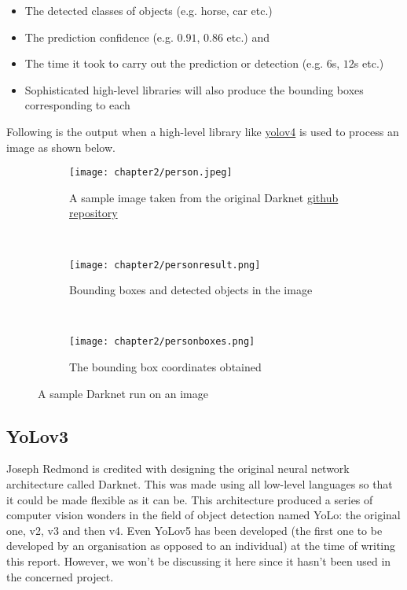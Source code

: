 \begin{itemize}
  \item The detected classes of objects (e.g. horse, car etc.)
  \item	The prediction confidence (e.g. $0.91$, $0.86$ etc.) and
  \item	The time it took to carry out the prediction or detection (e.g. $6$s, $12$s etc.)
  \item	Sophisticated high-level libraries will also produce the bounding boxes corresponding to each
\end{itemize}

\vspace{-0.1in}

Following is the output when a high-level library like \href{https://pypi.org/project/yolov4/}{yolov4} is used to process an image as shown below.

\begin{figure}[h]

\begin{center}
\begin{subfigure}{0.7\textwidth}
  \texttt{[image: chapter2/person.jpeg]}
  \caption{A sample image taken from the original Darknet \href{https://github.com/AlexeyAB/darknet}{github repository}}
  \label{fig:person_sub1}
 \end{subfigure} \\
 \begin{subfigure}{0.7\textwidth}
  \texttt{[image: chapter2/personresult.png]}
  \caption{Bounding boxes and detected objects in the image}
  \label{fig:person_sub2}
  \end{subfigure} \\
  \begin{subfigure}{0.7\textwidth}
   \texttt{[image: chapter2/personboxes.png]}
   \caption{The bounding box coordinates obtained}
   \label{fig:person_sub3}
 \end{subfigure}

 \caption{A sample Darknet run on an image}
 \label{fig:person_ref}

\end{center}

\end{figure}



\subsection{YoLov3 \cite{yolov3}}
Joseph Redmond is credited with designing the original neural network architecture called Darknet. This was made using all low-level languages so that it could be made flexible as it can be. This architecture produced a series of computer vision wonders in the field of object detection named YoLo: the original one, v2, v3 and then v4. Even YoLov5 has been developed (the first one to be developed by an organisation as opposed to an individual) at the time of writing this report. However, we won’t be discussing it here since it hasn’t been used in the concerned project. \par

